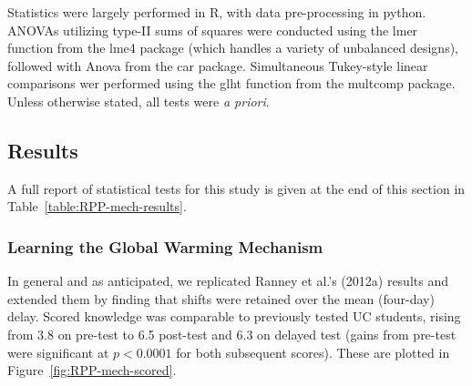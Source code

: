 Statistics were largely performed in R, with data pre-processing in python.
ANOVAs utilizing type-II sums of squares were conducted using the \textsf{lmer}
function from the \textsf{lme4} package (which handles a variety of unbalanced
designs), followed with \textsf{Anova} from the \textsf{car} package.
Simultaneous Tukey-style linear comparisons wer performed using the
\textsf{glht} function from the \textsf{multcomp} package. Unless otherwise
stated, all tests were \emph{a priori}.

\subsection{Results} 

A full report of statistical tests for this study is given at the end of this
section in Table~\ref{table:RPP-mech-results}.
    
\subsubsection{Learning the Global Warming Mechanism}

In general and as anticipated, we replicated Ranney et al.’s (2012a) results and
extended them by finding that shifts were retained over the mean (four-day)
delay.  Scored knowledge was comparable to previously tested UC students, rising
from 3.8 on pre-test to 6.5 post-test and 6.3 on delayed test (gains from pre-test
were significant at $p<0.0001$ for both subsequent scores). These are plotted in
Figure~\ref{fig:RPP-mech-scored}. 

